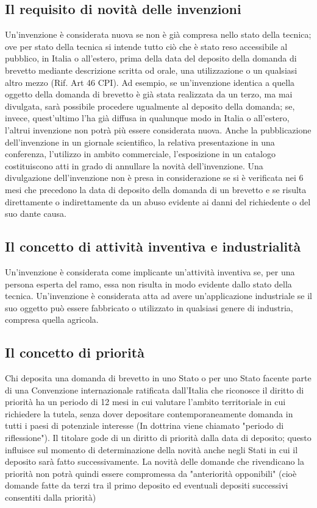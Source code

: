 \subsection{Il requisito di novità delle invenzioni}
Un’invenzione è considerata nuova se non è già compresa nello stato della tecnica; ove per stato della tecnica si intende tutto ciò che è stato reso accessibile al pubblico, in Italia o all’estero, prima della data del deposito della domanda di brevetto mediante descrizione scritta od orale, una utilizzazione o un qualsiasi altro mezzo (Rif. Art 46 CPI). Ad esempio, se un’invenzione identica a quella oggetto della domanda di brevetto è già stata realizzata da un terzo, ma mai divulgata, sarà possibile procedere ugualmente al deposito della domanda; se, invece, quest’ultimo l’ha già diffusa in qualunque modo in Italia o all’estero, l’altrui invenzione non potrà più essere considerata nuova. Anche la pubblicazione dell’invenzione in un giornale scientifico, la relativa presentazione in una conferenza, l’utilizzo in ambito commerciale, l’esposizione in un catalogo costituiscono atti in grado di annullare la novità dell’invenzione.
\newline Una divulgazione dell'invenzione non è presa in considerazione se si è verificata nei 6 mesi che precedono
la data di deposito della domanda di un brevetto e se risulta direttamente o indirettamente da un abuso evidente ai danni del richiedente
o del suo dante causa.

\subsection{Il concetto di attività inventiva e industrialità}
Un'invenzione è considerata come implicante un'attività inventiva se, per una persona esperta del ramo, essa non risulta in modo evidente
dallo stato della tecnica.\newline
Un'invenzione è considerata atta ad avere un'applicazione industriale se il suo oggetto può essere fabbricato o utilizzato in qualsiasi genere di
industria, compresa quella agricola.

\subsection{Il concetto di priorità}
Chi deposita una domanda di brevetto in uno Stato o per uno Stato facente parte di una Convenzione internazionale ratificata dall'Italia che riconosce
il diritto di priorità ha un periodo di 12 mesi in cui valutare l'ambito territoriale in cui richiedere la tutela, senza dover depositare contemporaneamente
domanda in tutti i paesi di potenziale interesse (In dottrina viene chiamato "periodo di riflessione").\newline
Il titolare gode di un diritto di priorità dalla data di deposito; questo influisce sul momento di determinazione della novità anche negli Stati in cui il deposito
sarà fatto successivamente.\newline
La novità delle domande che rivendicano la priorità non potrà quindi essere compromessa da "anteriorità opponibili" (cioè domande fatte da terzi tra il primo
deposito ed eventuali depositi successivi consentiti dalla priorità)

